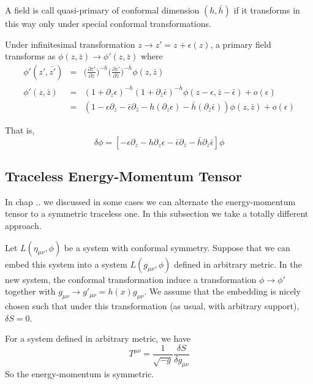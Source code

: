 \documentclass[12pt]{book}
\begin{document}
	A field is call quasi-primary of conformal dimension $(h,\bar h)$ if it transforms in this way only under special conformal transformations. 
	
	Under infinitesimal transformation $z\rightarrow z'=z+\epsilon(z)$, a primary field transforms as $\phi(z,\bar z)\rightarrow \phi'(z,\bar{z})$ where
	\begin{eqnarray}
		\phi'(z',\bar{z'})&=&\bigg(\frac {\partial z'}{\partial z}\bigg)^{-h}\bigg(\frac {\partial \bar{z'}}{\partial \bar z}\bigg)^{-\bar h}\phi(z,\bar z)\\
		\phi'(z,\bar{z})&=&(1+\partial_z\epsilon)^{-h}(1+\partial_{\bar z}\bar\epsilon)^{-\bar h}\phi(z-\epsilon,\bar z-\bar\epsilon)+o(\epsilon)\\
		&=&(1-\epsilon\partial_z-\bar\epsilon\partial_{\bar z}-h(\partial_z\epsilon)-\bar h(\partial_{\bar z}\bar\epsilon))\phi(z,\bar z)+o(\epsilon)
	\end{eqnarray}
	
	That is,
	\begin{equation}
		\delta\phi=[-\epsilon\partial_z-h\partial_z\epsilon-\bar\epsilon\partial_{\bar z}-\bar h\partial_{\bar z}\bar\epsilon]\phi \label{eqn:conf_var_phi}
	\end{equation}
	
	\subsection{Traceless Energy-Momentum Tensor}
	
	In chap .. we discussed in some cases we can alternate the energy-momentum tensor to a symmetric traceless one. In this subsection we take a totally different approach.
	
	Let $L(\eta_{\mu\nu},\phi)$ be a system with conformal symmetry. Suppose that we can embed this system into a system $L(g_{\mu\nu},\phi)$ defined in arbitrary metric. In the new system, the conformal transformation induce a transformation $\phi\rightarrow\phi'$ together with $g_{\mu\nu}\rightarrow g'_{\mu\nu}=h(x)g_{\mu\nu}$. We assume that the embedding is nicely chosen such that under this transformation (as usual, with arbitrary support), $\delta S=0$.
	
	For a system defined in arbitrary metric, we have
	\begin{equation}
		T^{\mu\nu}=\frac 1{\sqrt{-g}}\frac {\delta S}{\delta g_{\mu\nu}}
	\end{equation}
	So the energy-momentum is symmetric.
	
\end{document}
